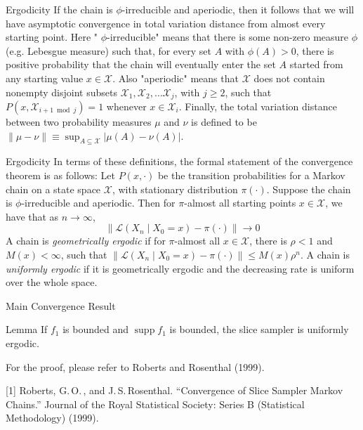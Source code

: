 \documentclass{beamer}
\begin{document}
\begin{frame}{Ergodicity}
	If the chain is $\phi$-irreducible and aperiodic, then it follows that we will have asymptotic convergence in total variation distance from almost every starting point. Here " $\phi$-irreducible" means that there is some non-zero measure $\phi$ (e.g. Lebesgue measure) such that, for every set $A$ with $\phi(A)>0$, there is positive probability that the chain will eventually enter the set $A$ started from any starting value $x \in \mathcal{X}$. Also "aperiodic" means that $\mathcal{X}$ does not contain nonempty disjoint subsets $\mathcal{X}_{1}, \mathcal{X}_{2}, \ldots \mathcal{X}_{j}$, with $j \geq 2$, such that $P\left(x, \mathcal{X}_{i+1 \bmod j}\right)=1$ whenever $x \in \mathcal{X}_{i}$. Finally,
	the total variation distance between two probability measures $\mu$ and $\nu$ is defined to be $\|\mu-\nu\| \equiv \sup _{A \subseteq \mathcal{X}}|\mu(A)-\nu(A)|$. 
\end{frame}
\begin{frame}{Ergodicity}
In terms of these definitions, the formal statement of the convergence theorem is as follows: Let $P(x, \cdot)$ be the transition probabilities for a Markov chain on a state space $\mathcal{X}$, with stationary distribution $\pi(\cdot)$. Suppose the chain is $\phi$-irreducible and aperiodic. Then for $\pi$-almost all starting points $x \in \mathcal{X}$, we have that as $n \rightarrow \infty$,
$$
\left\|\mathcal{L}\left(X_{n} \mid X_{0}=x\right)-\pi(\cdot)\right\| \rightarrow 0
$$
A chain is \emph{geometrically ergodic} if for $\pi$-almost all $x \in \mathcal{X}$, there is $\rho<1$ and $M(x)<\infty$, such that $\left\|\mathcal{L}\left(X_{n} \mid X_{0}=x\right)-\pi(\cdot)\right\| \leq M(x) \rho^{n}$. A chain is \emph{uniformly ergodic} if it is geometrically ergodic and the decreasing rate is uniform over the whole space.
\end{frame}
\begin{frame}{Main Convergence Result}
	\begin{block}{Lemma}
If $f_{1}$ is bounded and $\operatorname{supp} f_{1}$ is bounded, the slice sampler is uniformly ergodic.
	\end{block}
For the proof, please refer to Roberts and Rosenthal (1999).

\vspace{1cm}
[1] Roberts, G.\,O.\,, and  J.\,S.\,Rosenthal. ``Convergence of Slice Sampler Markov Chains.'' Journal of the Royal Statistical Society: Series B (Statistical Methodology) (1999).
\end{frame}
\end{document}
